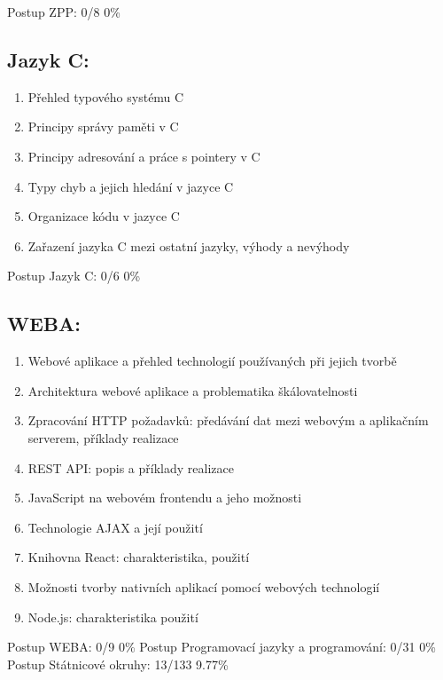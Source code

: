 \documentclass{article}
\begin{document}
	Postup ZPP: 0/8 0\%
	
	\subsection*{Jazyk C:}
	
	\begin{enumerate}[label=\arabic*.]
		\item Přehled typového systému C
		\item Principy správy paměti v C
		\item Principy adresování a práce s pointery v C
		\item Typy chyb a jejich hledání v jazyce C
		\item Organizace kódu v jazyce C
		\item Zařazení jazyka C mezi ostatní jazyky, výhody a nevýhody
	\end{enumerate}
	
	Postup Jazyk C: 0/6 0\%
	
	\subsection*{WEBA:}
	
	\begin{enumerate}[label=\arabic*.]
		\item Webové aplikace a přehled technologií používaných při jejich tvorbě
		\item Architektura webové aplikace a problematika škálovatelnosti
		\item Zpracování HTTP požadavků: předávání dat mezi webovým a aplikačním serverem, příklady realizace
		\item REST API: popis a příklady realizace
		\item JavaScript na webovém frontendu a jeho možnosti
		\item Technologie AJAX a její použití
		\item Knihovna React: charakteristika, použití
		\item Možnosti tvorby nativních aplikací pomocí webových technologií
		\item Node.js: charakteristika použití
	\end{enumerate}
	
	Postup WEBA: 0/9 0\%
	\newline
	\newline
	Postup Programovací jazyky a programování: 0/31 0\%
	\newline
	\newline
	Postup Státnicové okruhy: 13/133 9.77\%
	
\end{document}
